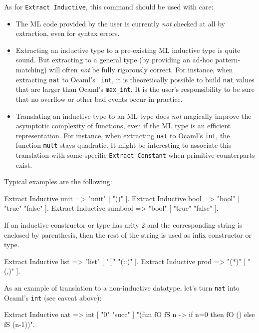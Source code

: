 As for {\tt Extract Inductive}, this command should be used with care:
\begin{itemize}
\item The ML code provided by the user is currently \emph{not} checked at all by
  extraction, even for syntax errors.

\item Extracting an inductive type to a pre-existing ML inductive type
is quite sound. But extracting to a general type (by providing an
ad-hoc pattern-matching) will often \emph{not} be fully rigorously
correct.  For instance, when extracting {\tt nat} to Ocaml's {\tt
int}, it is theoretically possible to build {\tt nat} values that are
larger than Ocaml's {\tt max\_int}. It is the user's responsibility to
be sure that no overflow or other bad events occur in practice.

\item Translating an inductive type to an ML type does \emph{not}
magically improve the asymptotic complexity of functions, even if the
ML type is an efficient representation. For instance, when extracting
{\tt nat} to Ocaml's {\tt int}, the function {\tt mult} stays
quadratic. It might be interesting to associate this translation with
some specific {\tt Extract Constant} when primitive counterparts exist.
\end{itemize}

\Example
Typical examples are the following:
\begin{coq_example}
Extract Inductive unit => "unit" [ "()" ].
Extract Inductive bool => "bool" [ "true" "false" ].
Extract Inductive sumbool => "bool" [ "true" "false" ].
\end{coq_example}

If an inductive constructor or type has arity 2 and the corresponding 
string is enclosed by parenthesis, then the rest of the string is used
as infix constructor or type. 
\begin{coq_example}
Extract Inductive list => "list" [ "[]" "(::)" ].
Extract Inductive prod => "(*)"  [ "(,)" ].
\end{coq_example}

As an example of translation to a non-inductive datatype, let's turn
{\tt nat} into Ocaml's {\tt int} (see caveat above):
\begin{coq_example}
Extract Inductive nat => int [ "0" "succ" ]
 "(fun fO fS n -> if n=0 then fO () else fS (n-1))".
\end{coq_example}


